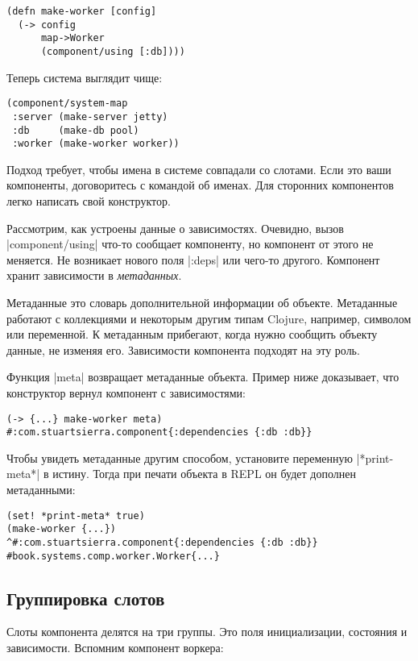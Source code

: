 \begin{verbatim}
(defn make-worker [config]
  (-> config
      map->Worker
      (component/using [:db])))
\end{verbatim}

Теперь система выглядит чище:

\begin{verbatim}
(component/system-map
 :server (make-server jetty)
 :db     (make-db pool)
 :worker (make-worker worker))
\end{verbatim}

Подход требует, чтобы имена в системе совпадали со слотами. Если это ваши
компоненты, договоритесь с командой об именах. Для сторонних компонентов легко
написать свой конструктор.

Рассмотрим, как устроены данные о зависимостях. Очевидно, вызов
\spverb|component/using| что-то сообщает компоненту, но компонент от этого не
меняется. Не возникает нового поля \spverb|:deps| или чего-то другого. Компонент
хранит зависимости в \emph{метаданных}.

Метаданные это словарь дополнительной информации об объекте. Метаданные работают
с коллекциями и некоторым другим типам Clojure, например, символом или
переменной. К метаданным прибегают, когда нужно сообщить объекту данные, не
изменяя его. Зависимости компонента подходят на эту роль.

Функция \spverb|meta| возвращает метаданные объекта. Пример ниже доказывает, что
конструктор вернул компонент с зависимостями:

\begin{verbatim}
(-> {...} make-worker meta)
#:com.stuartsierra.component{:dependencies {:db :db}}
\end{verbatim}

Чтобы увидеть метаданные другим способом, установите переменную
\spverb|*print-meta*| в истину. Тогда при печати объекта в REPL он будет
дополнен метаданными:

\begin{verbatim}
(set! *print-meta* true)
(make-worker {...})
^#:com.stuartsierra.component{:dependencies {:db :db}}
#book.systems.comp.worker.Worker{...}
\end{verbatim}

\subsection{Группировка слотов}

Слоты компонента делятся на три группы. Это поля инициализации, состояния и
зависимости. Вспомним компонент воркера:

